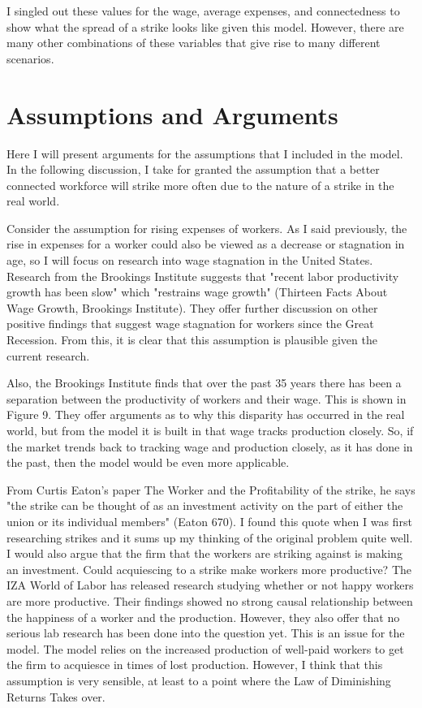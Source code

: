 \documentclass[11pt]{article}
\begin{document}
I singled out these values for the wage, average expenses, and connectedness to show what the spread of a strike looks like given this model. However, there are many other combinations of these variables that give rise to many different scenarios. 

\section{Assumptions and Arguments} \hrulefill

Here I will present arguments for the assumptions that I included in the model. In the following discussion, I take for granted the assumption that a better connected workforce will strike more often due to the nature of a strike in the real world.

Consider the assumption for rising expenses of workers. As I said previously, the rise in expenses for a worker could also be viewed as a decrease or stagnation in age, so I will focus on research into wage stagnation in the United States. Research from the Brookings Institute suggests that "recent labor productivity growth has been slow" which "restrains wage growth" (Thirteen Facts About Wage Growth, Brookings Institute). They offer further discussion on other positive findings that suggest wage stagnation for workers since the Great Recession. From this, it is clear that this assumption is plausible given the current research. 

Also, the Brookings Institute finds that over the past 35 years there has been a separation between the productivity of workers and their wage. This is shown in Figure 9. They offer arguments as to why this disparity has occurred in the real world, but from the model it is built in that wage tracks production closely. So, if the market trends back to tracking wage and production closely, as it has done in the past, then the model would be even more applicable. 

 From Curtis Eaton's paper The Worker and the Profitability of the strike, he says "the strike can be thought of as an investment activity on the part of either the union or its individual members" (Eaton 670). I found this quote when I was first researching strikes and it sums up my thinking of the original problem quite well. I would also argue that the firm that the workers are striking against is making an investment. Could acquiescing to a strike make workers more productive? The IZA World of Labor has released research studying whether or not happy workers are more productive. Their findings showed no strong causal relationship between the happiness of a worker and the production. However, they also offer that no serious lab research has been done into the question yet. This is an issue for the model. The model relies on the increased production of well-paid workers to get the firm to acquiesce in times of lost production. However, I think that this assumption is very sensible, at least to a point where the Law of Diminishing Returns Takes over. 
\end{document}
